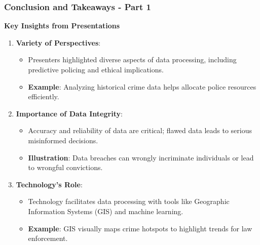 \documentclass[aspectratio=169]{beamer}
\begin{document}
\begin{frame}[fragile]
    \frametitle{Conclusion and Takeaways - Part 1}
    
    \textbf{Key Insights from Presentations}
    
    \begin{enumerate}
        \item \textbf{Variety of Perspectives}:
            \begin{itemize}
                \item Presenters highlighted diverse aspects of data processing, including predictive policing and ethical implications.
                \item \textbf{Example}: Analyzing historical crime data helps allocate police resources efficiently.
            \end{itemize}
        
        \item \textbf{Importance of Data Integrity}:
            \begin{itemize}
                \item Accuracy and reliability of data are critical; flawed data leads to serious misinformed decisions.
                \item \textbf{Illustration}: Data breaches can wrongly incriminate individuals or lead to wrongful convictions.
            \end{itemize}
            
        \item \textbf{Technology's Role}:
            \begin{itemize}
                \item Technology facilitates data processing with tools like Geographic Information Systems (GIS) and machine learning.
                \item \textbf{Example}: GIS visually maps crime hotspots to highlight trends for law enforcement.
            \end{itemize}
    \end{enumerate}

\end{frame}
\end{document}
